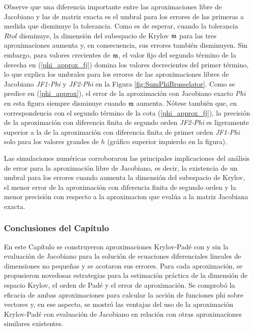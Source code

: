 Observe que una diferencia importante entre las aproximaciones libre de Jacobiano y las de matriz exacta es el umbral para los errores de las primeras a medida que disminuye la tolerancia. Como es de esperar, cuando la tolerancia $Rtol$ disminuye, la dimensión del subespacio de Krylov $\mathfrak{m}$ para las tres aproximaciones aumenta y, en consecuencia, sus errores también disminuyen. Sin embargo, para valores crecientes de $\mathfrak{m}$, el valor fijo del segundo término de la derecha en (\ref{phi_approx_fj}) domina los valores decrecientes del primer término, lo que explica los umbrales para los errores de las aproximaciones libres de Jacobiano \textit{JF1-Phi} y \textit{JF2-Phi} en la Figura \ref{fig:SumPhiBrusselator}. Como se predice en (\ref{phi_approx}), el error de la aproximación con Jacobiano exacto \textit{Phi} en esta figura siempre disminuye cuando $\mathfrak{m}$ aumenta. Nótese también que, en correspondencia con el segundo término de la cota (\ref{phi_approx_fj}), la precisión de la aproximación con diferencia finita de segundo orden \textit{JF2-Phi} es ligeramente superior a la de la aproximación con diferencia finita de primer orden \textit{JF1-Phi} solo para los valores grandes de $h$ (gráfico superior izquierdo en la figura).

Las simulaciones numéricas corroboraron las principales implicaciones del análisis de error para la aproximación libre de Jacobiano, es decir, la existencia de un umbral para los errores cuando aumenta la dimensión del subespacio de Krylov, el menor error de la aproximación con diferencia finita de segundo orden y la menor precisión con respecto a la aproximacion que evalúa a la matriz Jacobiana exacta.

\subsubsection{Conclusiones del Capítulo}
En este Capítulo se construyeron aproximaciones Krylov-Padé con y sin la evaluación de Jacobiano para la solución de ecuaciones diferenciales lineales de dimensiones no pequeñas y se acotaron sus errores. Para cada aproximación, se propusieron novedosas estrategias para la estimación práctica de la dimensión de espacio Krylov, el orden de Padé y el error de aproximación. Se comprobó la eficacia de ambas aproximaciones para calcular la acción de funciones phi sobre vectores y, en ese aspecto, se
mostró las ventajas del uso de la aproximación Krylov-Padé con evaluación de Jacobiano en relación con otras aproximaciones similares existentes.

